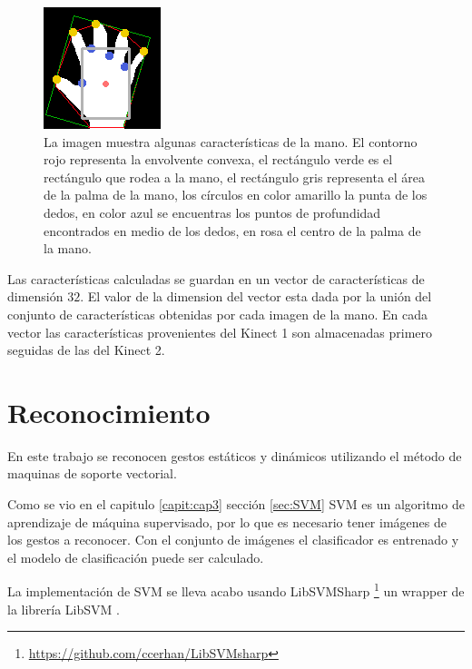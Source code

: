 \begin{figure}[h!]
\begin{center} 
\includegraphics[scale=1]{./Figures/250_Dedos.png}
\end{center}
\caption{La imagen muestra algunas características de la mano. El contorno rojo representa la envolvente convexa, el rectángulo verde es el rectángulo que rodea a la mano, el rectángulo gris representa el área de la palma de la mano, los círculos en color amarillo la punta de los dedos, en color azul se encuentras los puntos de profundidad encontrados en medio de los dedos, en rosa el centro de la palma de la mano.}
\label{fig:FeaturesOfHand}
\end{figure}

Las características calculadas se guardan en un vector de características de dimensión $32$. El valor de la dimension del vector esta dada por la unión del conjunto de características obtenidas por cada imagen de la mano. En cada vector las características provenientes del Kinect 1 son almacenadas primero seguidas de las del Kinect 2.





\section{Reconocimiento}\label{sec:ReconocimientoSystem}

En este trabajo se reconocen gestos estáticos y dinámicos utilizando el método de maquinas de soporte vectorial.  

Como se vio en el capitulo \ref{capit:cap3} sección \ref{sec:SVM} SVM es un algoritmo de aprendizaje de máquina supervisado, por lo que es necesario tener imágenes de los gestos a reconocer. Con el conjunto de imágenes el clasificador es entrenado y el modelo de clasificación puede ser calculado. 

La implementación de SVM se lleva acabo usando LibSVMSharp \footnote{\url{https://github.com/ccerhan/LibSVMsharp}} un wrapper de la librería LibSVM \citep{Chang2011}.


